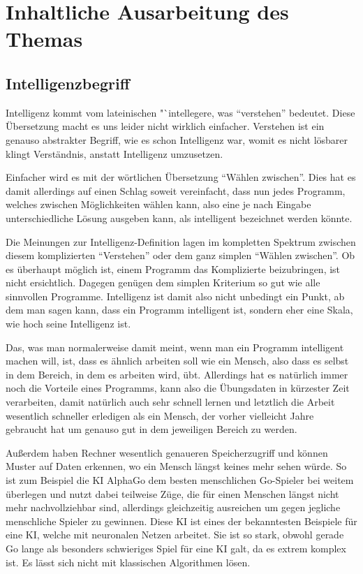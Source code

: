 \section{Inhaltliche Ausarbeitung des Themas}

\subsection{Intelligenzbegriff}
Intelligenz kommt vom lateinischen "`intellegere, was "`verstehen"' bedeutet.
Diese Übersetzung macht es uns leider nicht wirklich einfacher.
Verstehen ist ein genauso abstrakter Begriff, wie es schon Intelligenz war, womit es nicht lösbarer klingt Verständnis, anstatt Intelligenz umzusetzen.


Einfacher wird es mit der wörtlichen Übersetzung "`Wählen zwischen"'.
Dies hat es damit allerdings auf einen Schlag soweit vereinfacht, dass nun jedes Programm, welches zwischen Möglichkeiten wählen kann, also eine je nach Eingabe unterschiedliche Lösung ausgeben kann, als intelligent bezeichnet werden könnte.


Die Meinungen zur Intelligenz-Definition lagen im kompletten Spektrum zwischen diesem komplizierten "`Verstehen"' oder dem ganz simplen "`Wählen zwischen"'.
Ob es überhaupt möglich ist, einem Programm das Komplizierte beizubringen, ist nicht ersichtlich.
Dagegen genügen dem simplen Kriterium so gut wie alle sinnvollen Programme.
Intelligenz ist damit also nicht unbedingt ein Punkt, ab dem man sagen kann, dass ein Programm intelligent ist, sondern eher eine Skala, wie hoch seine Intelligenz ist.

Das, was man normalerweise damit meint, wenn man ein Programm intelligent machen will, ist, dass es ähnlich arbeiten soll wie ein Mensch, also dass es selbst in dem Bereich, in dem es arbeiten wird, übt.
Allerdings hat es natürlich immer noch die Vorteile eines Programms, kann also die Übungsdaten in kürzester Zeit verarbeiten, damit natürlich auch sehr schnell lernen und letztlich die Arbeit wesentlich schneller erledigen als ein Mensch, der vorher vielleicht Jahre gebraucht hat um genauso gut in dem jeweiligen Bereich zu werden.

Außerdem haben Rechner wesentlich genaueren Speicherzugriff und können Muster auf Daten erkennen, wo ein Mensch längst keines mehr sehen würde.
So ist zum Beispiel die KI AlphaGo dem besten menschlichen Go-Spieler bei weitem überlegen und nutzt dabei teilweise Züge, die für einen Menschen längst nicht mehr nachvollziehbar sind, allerdings gleichzeitig ausreichen um gegen jegliche menschliche Spieler zu gewinnen.
Diese KI ist eines der bekanntesten Beispiele für eine KI, welche mit neuronalen Netzen arbeitet.
Sie ist so stark, obwohl gerade Go lange als besonders schwieriges Spiel für eine KI galt, da es extrem komplex ist.
Es lässt sich nicht mit klassischen Algorithmen lösen.


